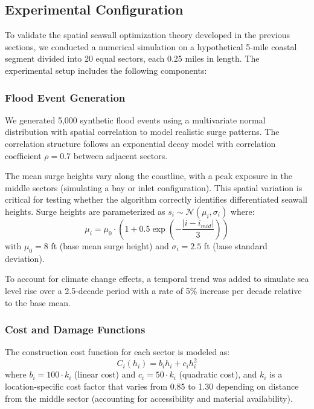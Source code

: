 \documentclass{article}
\begin{document}
\subsection{Experimental Configuration}
To validate the spatial seawall optimization theory developed in the previous sections, we conducted a numerical simulation on a hypothetical 5-mile coastal segment divided into 20 equal sectors, each 0.25 miles in length. The experimental setup includes the following components:

\subsubsection{Flood Event Generation}
We generated 5,000 synthetic flood events using a multivariate normal distribution with spatial correlation to model realistic surge patterns. The correlation structure follows an exponential decay model with correlation coefficient $\rho = 0.7$ between adjacent sectors.

The mean surge heights vary along the coastline, with a peak exposure in the middle sectors (simulating a bay or inlet configuration). This spatial variation is critical for testing whether the algorithm correctly identifies differentiated seawall heights.  Surge heights are parameterized as $s_i \sim \mathcal{N}(\mu_i, \sigma_i)$ where:
\begin{equation}
\mu_i = \mu_0 \cdot \left(1 + 0.5 \exp\left(-\frac{|i - i_{mid}|}{3}\right)\right)
\end{equation}
with $\mu_0 = 8$ ft (base mean surge height) and $\sigma_i = 2.5$ ft (base standard deviation).

To account for climate change effects, a temporal trend was added to simulate sea level rise over a 2.5-decade period with a rate of 5\% increase per decade relative to the base mean.

\subsubsection{Cost and Damage Functions}
The construction cost function for each sector is modeled as:
\begin{equation}
C_i(h_i) = b_i h_i + c_i h_i^2
\end{equation}
where $b_i = 100 \cdot k_i$ (linear cost) and $c_i = 50 \cdot k_i$ (quadratic cost), and $k_i$ is a location-specific cost factor that varies from 0.85 to 1.30 depending on distance from the middle sector (accounting for accessibility and material availability).
\end{document}
